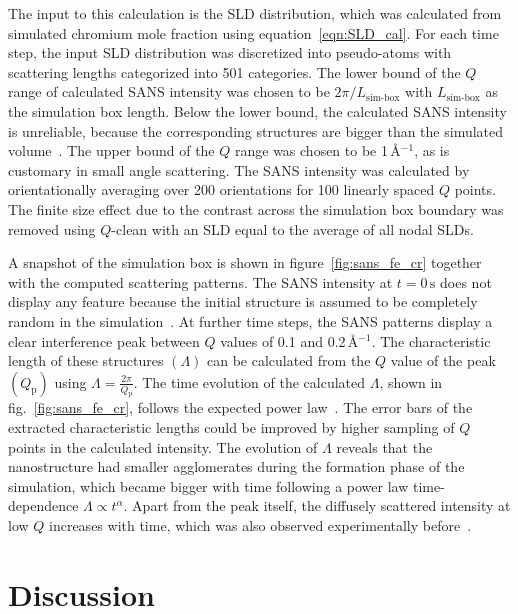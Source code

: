 \documentclass[preprint, 5p, times, twocolumn]{elsarticle}
\begin{document}
The input to this calculation is the SLD distribution, which was calculated from simulated chromium mole fraction using equation~\ref{eqn:SLD_cal}. For each time step, the input SLD distribution was discretized into pseudo-atoms with scattering lengths categorized into 501 categories. The lower bound of the $Q$ range of calculated SANS intensity was chosen to be $2\pi/L_{\text{sim-box}}$ with $L_{\text{sim-box}}$ as the simulation box length. Below the lower bound, the calculated SANS intensity is unreliable, because the corresponding structures are bigger than the simulated volume~\cite{frenkel1986structure, majumdar2024computation}. The upper bound of the $Q$ range was chosen to be 1\,\AA{$^{-1}$}, as is customary in small angle scattering. The SANS intensity was calculated by orientationally averaging over 200 orientations for 100 linearly spaced $Q$ points. The finite size effect due to the contrast across the simulation box boundary was removed using $Q$-clean with an SLD equal to the average of all nodal SLDs.

A snapshot of the simulation box is shown in figure~\ref{fig:sans_fe_cr} together with the computed scattering patterns. The SANS intensity at $t=0\,\text{s}$ does not display any feature because the initial structure is assumed to be completely random in the simulation~\cite{zhou2017effect}. At further time steps, the SANS patterns display a clear interference peak between $Q$ values of 0.1 and 0.2\,\AA{$^{-1}$}. The characteristic length of these structures $(\Lambda)$ can be calculated from the $Q$ value of the peak $(Q_{\text{p}})$ using $\Lambda=\frac{2\pi}{Q_{\text{p}}}$. The time evolution of the calculated $\Lambda$, shown in fig.~\ref{fig:sans_fe_cr}, follows the expected power law~\cite{hoernqvist2015early}. The error bars of the extracted characteristic lengths could be improved by higher sampling of $Q$ points in the calculated intensity. The evolution of $\Lambda$ reveals that the nanostructure had smaller agglomerates during the formation phase of the simulation, which became bigger with time following a power law time-dependence $\Lambda \propto t^\alpha$. Apart from the peak itself, the diffusely scattered intensity at low $Q$ increases with time, which was also observed experimentally before~\cite{furusaka1983spinodal}.

\section{Discussion}
\label{sec:disc}
\end{document}
